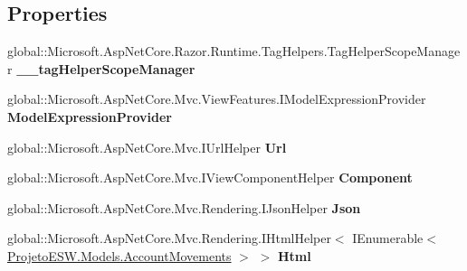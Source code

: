 \subsection*{Properties}
\begin{DoxyCompactItemize}
\item 
\mbox{\label{class_asp_net_core_1_1_views___account_movements___index_a3af3e949878dd79d69ce99cf6de5a37e}} 
global\+::\+Microsoft.\+Asp\+Net\+Core.\+Razor.\+Runtime.\+Tag\+Helpers.\+Tag\+Helper\+Scope\+Manager {\bfseries \+\_\+\+\_\+tag\+Helper\+Scope\+Manager}
\item 
\mbox{\label{class_asp_net_core_1_1_views___account_movements___index_aebac56f355ab1332cfaa27035a29ed3d}} 
global\+::\+Microsoft.\+Asp\+Net\+Core.\+Mvc.\+View\+Features.\+I\+Model\+Expression\+Provider {\bfseries Model\+Expression\+Provider}
\item 
\mbox{\label{class_asp_net_core_1_1_views___account_movements___index_aa52eafcfb4f82ef884b9eef5ffeee91d}} 
global\+::\+Microsoft.\+Asp\+Net\+Core.\+Mvc.\+I\+Url\+Helper {\bfseries Url}
\item 
\mbox{\label{class_asp_net_core_1_1_views___account_movements___index_a7b6038864a139cdc831eed4dbc6a941a}} 
global\+::\+Microsoft.\+Asp\+Net\+Core.\+Mvc.\+I\+View\+Component\+Helper {\bfseries Component}
\item 
\mbox{\label{class_asp_net_core_1_1_views___account_movements___index_a4a693c898f469a536c539e16d209f87a}} 
global\+::\+Microsoft.\+Asp\+Net\+Core.\+Mvc.\+Rendering.\+I\+Json\+Helper {\bfseries Json}
\item 
\mbox{\label{class_asp_net_core_1_1_views___account_movements___index_a64c5448e3052d467bf0510bd3ba87e56}} 
global\+::\+Microsoft.\+Asp\+Net\+Core.\+Mvc.\+Rendering.\+I\+Html\+Helper$<$ I\+Enumerable$<$ \mbox{\hyperlink{class_projeto_e_s_w_1_1_models_1_1_account_movements}{Projeto\+E\+S\+W.\+Models.\+Account\+Movements}} $>$ $>$ {\bfseries Html}
\end{DoxyCompactItemize}
